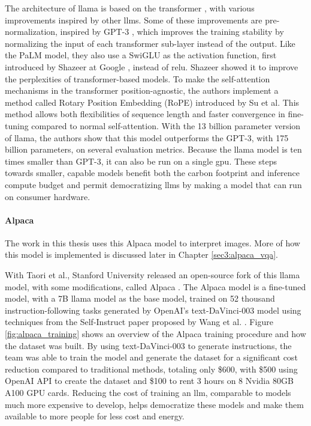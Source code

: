     
    The architecture of \gls{llama} is based on the transformer \cite{vaswaniAttentionAllYou2017}, with various improvements inspired by other \glspl{llm}. Some of these improvements are pre-normalization, inspired by GPT-3 \cite{brownLanguageModelsAre2020}, which improves the training stability by normalizing the input of each transformer sub-layer instead of the output. Like the PaLM model, they also use a SwiGLU as the activation function, first introduced by Shazeer at Google \cite{shazeerGLUVariantsImprove2020}, instead of \gls{relu}. Shazeer showed it to improve the perplexities of transformer-based models. To make the self-attention mechanisms in the transformer position-agnostic, the authors implement a method called Rotary Position Embedding (RoPE) introduced by Su et al. This method allows both flexibilities of sequence length and faster convergence in fine-tuning compared to normal self-attention. With the 13 billion parameter version of \gls{llama}, the authors show that this model outperforms the GPT-3, with 175 billion parameters, on several evaluation metrics. Because the \gls{llama} model is ten times smaller than GPT-3, it can also be run on a single \gls{gpu}. These steps towards smaller, capable models benefit both the carbon footprint and inference compute budget and permit democratizing \glspl{llm} by making a model that can run on consumer hardware.

    \paragraph{Alpaca\\}
    The work in this thesis uses this Alpaca model to interpret images. More of how this model is implemented is discussed later in Chapter \ref{sec3:alpaca_vqa}.
    
    With Taori et al., Stanford University released an open-source fork of this \gls{llama} model, with some modifications, called Alpaca \cite{taoriStanfordCRFM, taoriStanfordAlpacaInstructionfollowing2023}. The Alpaca model is a fine-tuned model, with a 7B \gls{llama} model as the base model, trained on 52 thousand instruction-following tasks generated by OpenAI's text-DaVinci-003 model \cite{OpenAIAPI} using techniques from the Self-Instruct paper proposed by Wang et al. \cite{wangSelfInstructAligningLanguage2022}. Figure \ref{fig:alpaca_training} shows an overview of the Alpaca training procedure and how the dataset was built. By using text-DaVinci-003 to generate instructions, the team was able to train the model and generate the dataset for a significant cost reduction compared to traditional methods, totaling only \$600, with \$500 using OpenAI API to create the dataset and \$100 to rent 3 hours on 8 Nvidia 80GB A100 GPU cards. Reducing the cost of training an \gls{llm}, comparable to models much more expensive to develop, helps democratize these models and make them available to more people for less cost and energy.

